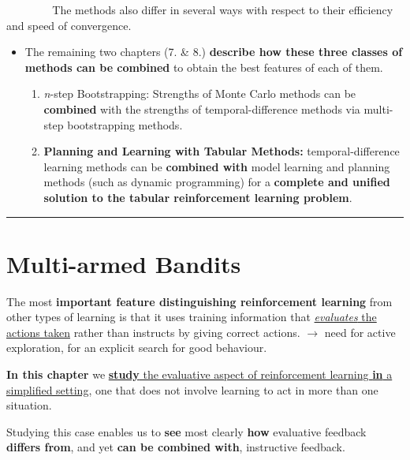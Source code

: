 \documentclass[12pt, a4paper]{article}
\let\stdsection\section
\renewcommand\section{\newpage\stdsection} %
\begin{document}
~ ~ ~ ~ ~ The methods also differ in several ways with respect to their
efficiency and speed of convergence.

\begin{itemize}
\item
  The remaining two chapters (7. \& 8.) \textbf{describe how these three
  classes of methods can be combined} to obtain the best features of
  each of them.

  \begin{enumerate}
  \def\labelenumi{\arabic{enumi}.}
  \setcounter{enumi}{6}
  \item
    \emph{n}-step Bootstrapping: Strengths of Monte Carlo methods can be
    \textbf{combined} with the strengths of temporal-difference methods
    via multi-step bootstrapping methods.
  \item
    \textbf{Planning and Learning with Tabular Methods:}
    temporal-difference learning methods can be \textbf{combined with}
    model learning and planning methods (such as dynamic programming)
    for a \textbf{complete and unified solution to the tabular
    reinforcement learning problem}.
  \end{enumerate}
\end{itemize}

\begin{center}\rule{0.5\linewidth}{0.5pt}\end{center}
\newpage










\section{Multi-armed Bandits}\label{multi-armed-bandits}

The most \textbf{important feature distinguishing reinforcement
learning} from other types of learning is that it uses training
information that \uline{\emph{evaluates} the actions taken} rather than instructs by giving correct actions. \(\rightarrow\) need for active exploration, for an explicit search for good behaviour.

\textbf{In this chapter} we \uline{\textbf{study} the evaluative aspect of reinforcement learning \textbf{in} a simplified setting}, one that does not involve learning to act in more than one situation.

Studying this case enables us to \textbf{see} most clearly \textbf{how}
evaluative feedback \textbf{differs from}, and yet \textbf{can be
combined with}, instructive feedback.
\end{document}
